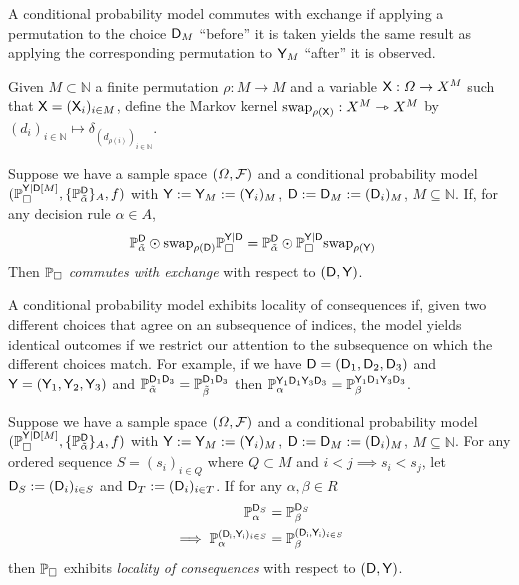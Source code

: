 A conditional probability model commutes with exchange if applying a permutation to the choice $\mathsf{D}_M$ ``before'' it is taken yields the same result as applying the corresponding permutation to $\mathsf{Y}_M$ ``after'' it is observed.

\begin{definition}
Given $M\subset \mathbb{N}$ a finite permutation $\rho:M\to M$ and a variable $\mathsf{X}:\Omega\to X^M$ such that $\mathsf{X}=(\mathsf{X}_i)_{i\in M}$, define the Markov kernel $\text{swap}_{\rho(\mathsf{X})}:X^M\rightarrowtriangle X^M$ by $(d_i)_{i\in\mathbb{N}}\mapsto \delta_{(d_{\rho(i)})_{i\in\mathbb{N}}}$.
\end{definition}

\begin{definition}\label{def:caus_exch}
Suppose we have a sample space $(\Omega,\mathcal{F})$ and a conditional probability model $(\mathbb{P}_\square^{\mathsf{Y}|\mathsf{D}[M]},\{\mathbb{P}_{\tilde{\alpha}}^{\mathsf{D}}\}_A,f)$ with $\mathsf{Y}:=\mathsf{Y}_M:=(\mathsf{Y}_i)_{M}$, $\mathsf{D}:=\mathsf{D}_M:=(\mathsf{D}_i)_M$, $M\subseteq \mathbb{N}$. If, for any decision rule $\alpha \in A$,
\begin{align}
    \mathbb{P}_{\tilde{\alpha}}^{\mathsf{D}}\odot \text{swap}_{\rho(\mathsf{D})} \mathbb{P}_{\square}^{\mathsf{Y}|\mathsf{D}} &= \mathbb{P}_{\tilde{\alpha}}^{\mathsf{D}}\odot \mathbb{P}_{\square}^{\mathsf{Y}|\mathsf{D}}\text{swap}_{\rho(\mathsf{Y})}
\end{align}
Then $\mathbb{P}_\square$ \emph{commutes with exchange} with respect to $(\mathsf{D},\mathsf{Y})$.
\end{definition}

A conditional probability model exhibits locality of consequences if, given two different choices that agree on an subsequence of indices, the model yields identical outcomes if we restrict our attention to the subsequence on which the different choices match. For example, if we have $\mathsf{D}=(\mathsf{D}_1,\mathsf{D}_2,\mathsf{D}_3)$ and $\mathsf{Y}=(\mathsf{Y}_1,\mathsf{Y}_2,\mathsf{Y}_3)$ and $\mathbb{P}_{\tilde{\alpha}}^{\mathsf{D}_1\mathsf{D}_3}=\mathbb{P}_{\tilde{\beta}}^{\mathsf{D}_1\mathsf{D}_3}$ then $\mathbb{P}_{\alpha}^{\mathsf{Y}_1\mathsf{D}_1\mathsf{Y}_3\mathsf{D}_3}=\mathbb{P}_\beta^{\mathsf{Y}_1\mathsf{D}_1\mathsf{Y}_3\mathsf{D}_3}$.

\begin{definition}\label{def:caus_cont}
Suppose we have a sample space $(\Omega,\mathcal{F})$ and a conditional probability model $(\mathbb{P}_\square^{\mathsf{Y}|\mathsf{D}[M]},\{\mathbb{P}_{\tilde{\alpha}}^{\mathsf{D}}\}_A,f)$ with $\mathsf{Y}:=\mathsf{Y}_M:=(\mathsf{Y}_i)_{M}$, $\mathsf{D}:=\mathsf{D}_M:=(\mathsf{D}_i)_M$, $M\subseteq \mathbb{N}$. For any ordered sequence $S=(s_i)_{i\in Q}$ where $Q\subset M$ and $i<j\implies s_i<s_j$, let $\mathsf{D}_S:=(\mathsf{D}_i)_{i\in S}$ and $\mathsf{D}_T:=(\mathsf{D}_i)_{i\in T}$. If for any $\alpha,\beta\in R$
\begin{align}
    \mathbb{P}_\alpha^{\mathsf{D}_{S}}&=\mathbb{P}_\beta^{\mathsf{D}_{S}}\\
    \implies \mathbb{P}_\alpha^{(\mathsf{D_i,Y_i})_{i\in S}}&=\mathbb{P}_\beta^{(\mathsf{D_i,Y_i})_{i\in S}}
\end{align}
then $\mathbb{P}_\square$ exhibits \emph{locality of consequences} with respect to $(\mathsf{D},\mathsf{Y})$.
\end{definition}

